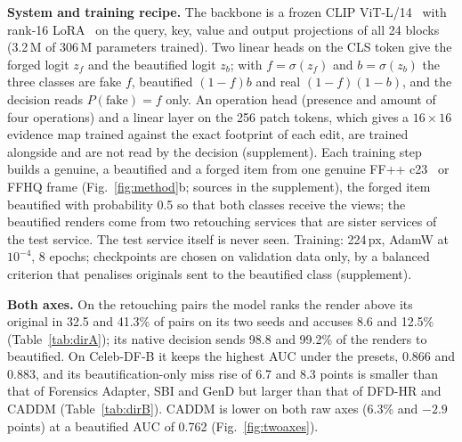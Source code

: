 \documentclass[conference]{IEEEtran}
\begin{document}
\textbf{System and training recipe.} The backbone is a frozen CLIP ViT-L/14~\cite{clip} with rank-16 LoRA~\cite{lora} on the
query, key, value and output projections of all 24 blocks (3.2\,M of 306\,M parameters trained). Two linear heads on the CLS
token give the forged logit $z_f$ and the beautified logit $z_b$; with $f=\sigma(z_f)$ and $b=\sigma(z_b)$ the three classes
are fake $f$, beautified $(1-f)b$ and real $(1-f)(1-b)$, and the decision reads $P(\text{fake})=f$ only. An operation head
(presence and amount of four operations) and a linear layer on the 256 patch tokens, which gives a $16\times16$ evidence map
trained against the exact footprint of each edit, are trained alongside and are not read by the decision (supplement).
Each training step builds a genuine, a beautified and a forged item from one genuine FF++ c23~\cite{ffpp} or FFHQ frame
(Fig.~\ref{fig:method}b; sources in the supplement), the forged item beautified with probability 0.5 so that both classes
receive the views; the beautified renders come from two retouching services that are sister services of the test service.
The test service itself is never seen. Training: 224\,px, AdamW at $10^{-4}$, 8 epochs; checkpoints are chosen on validation
data only, by a balanced criterion that penalises originals sent to the beautified class (supplement).


\textbf{Both axes.} On the retouching pairs the model ranks the render above its original in 32.5 and 41.3\% of pairs on
its two seeds and accuses 8.6 and 12.5\% (Table~\ref{tab:dirA}); its native decision sends 98.8 and 99.2\% of the renders to
beautified. On Celeb-DF-B it keeps the highest AUC under the presets, 0.866 and 0.883, and its beautification-only miss rise
of 6.7 and 8.3 points is smaller than that of Forensics Adapter, SBI and GenD but larger than that of DFD-HR and CADDM
(Table~\ref{tab:dirB}). CADDM is lower on both raw axes (6.3\% and $-2.9$ points) at a beautified AUC of 0.762
(Fig.~\ref{fig:twoaxes}).
\end{document}
